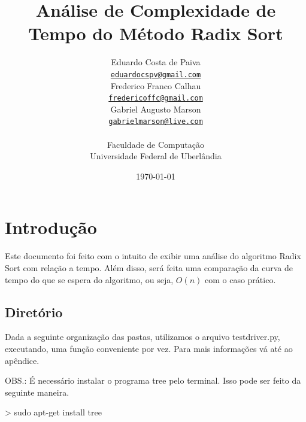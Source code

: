 \documentclass[12pt,a4paper,twoside]{report}
\title{Análise de Complexidade de Tempo do Método Radix Sort}
\date{}
\author{Eduardo Costa de Paiva \\
\texttt{\small \url{eduardocspv@gmail.com}}\\
Frederico Franco Calhau \\
\texttt{\small \url{fredericoffc@gmail.com}}\\
Gabriel Augusto Marson \\
\texttt{\small \url{gabrielmarson@live.com}}\\
\vspace{1cm} \\
Faculdade de Computação \\
Universidade Federal de Uberlândia
}
\date{\today}
\begin{document}
  \maketitle
\listoffigures
\listoftables
\lstlistoflistings

\tableofcontents


\fancyhead[RE,LO]{\thesection}

\setlength{\parskip}{0.15in} %

\chapter{Introdução}
Este documento foi feito com o intuito de exibir uma análise do algoritmo Radix Sort
com relação a tempo. Além disso, será feita uma comparação da curva de tempo do que se espera do
algoritmo, ou seja, $O(n)$ com o caso prático.

\section{Diretório}

Dada a seguinte organização das pastas, utilizamos o arquivo testdriver.py,  executando, uma função conveniente por vez. Para mais informações vá até ao apêndice.

OBS.: É necessário instalar o programa tree pelo terminal. Isso pode ser feito da seguinte maneira.

\begin{terminal}
> sudo apt-get install tree
\end{terminal}
\end{document}
